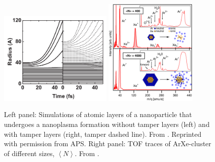 \begin{figure}
	\centering
		\includegraphics[width=0.49\textwidth]{images/tamper-layers.png}
		\includegraphics[width=0.4\textwidth]{images/Hoener-image.jpg}
	\caption[Effects of tamper layers to nanoparticles that undergo a nanoplasma formation.]{Left panel: Simulations of atomic layers of a nanoparticle that undergoes a nanoplasma formation without tamper layers (left) and with tamper layers (right, tamper dashed line). From \citep{Hau-Riege-2007-PRL}. Reprinted with permission from APS. Right panel: TOF traces of ArXe-cluster of different sizes, $\left\langle N\right\rangle$. From \citep[\href{https://creativecommons.org/licenses/by/3.0/}{\ccby}]{Hoener-2008-JPB}.}
	\label{fig:sacrificial-image}
\end{figure}
%
